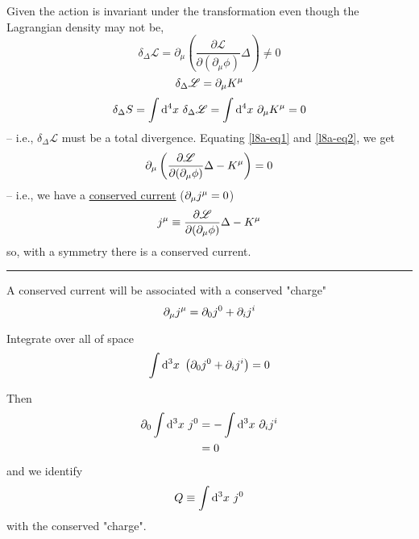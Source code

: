 \documentclass{article}
\begin{document}
\noindent Given the action is invariant under the transformation even though the \linebreak Lagrangian density may not be,
\begin{equation} \label{l8a-eq1}
    \delta_\Delta \mathscr{L} = \partial_\mu \left( \dfrac{ \partial \mathscr{L} }{ \partial ( \partial_\mu \phi ) } \Delta \right) \neq 0
\end{equation} %
\begin{equation} \label{l8a-eq2}
    \delta_\Delta \mathscr{L} = \partial_\mu \tensor{K}{^\mu}
\end{equation} %
\begin{equation*}
    \delta_\Delta S = \int \mathrm{d}^4 x~ \delta_\Delta \mathscr{L} = \int \mathrm{d}^4 x~ \partial_\mu \tensor{K}{^\mu} = 0
\end{equation*}
-- i.e., $\delta_\Delta \mathscr{L}$ must be a total divergence. Equating \eqref{l8a-eq1} and \eqref{l8a-eq2}, we get
\begin{equation*}
    \partial_\mu \left( \dfrac{ \partial \mathscr{L} }{ \partial ( \partial_\mu \phi ) } \Delta - \tensor{K}{^\mu} \right) = 0
\end{equation*}
-- i.e., we have a \underline{conserved current} ($\partial_\mu \tensor{j}{^\mu} = 0$)
\begin{equation*}
    \tensor{j}{^\mu} \equiv \dfrac{ \partial \mathscr{L} }{ \partial ( \partial_\mu \phi ) } \Delta - \tensor{K}{^\mu}
\end{equation*}
so, with a symmetry there is a conserved current.



\noindent\rule{\textwidth}{.5pt}

\noindent A conserved current will be associated with a conserved "charge"
\begin{equation*}
    \partial_\mu \tensor{j}{^\mu} = \partial_0 \tensor{j}{^0} + \partial_i \tensor{j}{^i}
\end{equation*}

\noindent Integrate over all of space
\begin{equation*}
    \int \mathrm{d}^3 x~ \left( \partial_0 \tensor{j}{^0} + \partial_i \tensor{j}{^i} \right) = 0
\end{equation*}

\noindent Then
\begin{align*}
    \partial_0 \int \mathrm{d}^3 x~ \tensor{j}{^0} &= - \int \mathrm{d}^3 x~ \partial_i \tensor{j}{^i} \\
    &= 0
\end{align*}
and we identify
\begin{equation*}
    Q \equiv \int \mathrm{d}^3 x~ \tensor{j}{^0}
\end{equation*}
with the conserved "charge".
\end{document}
